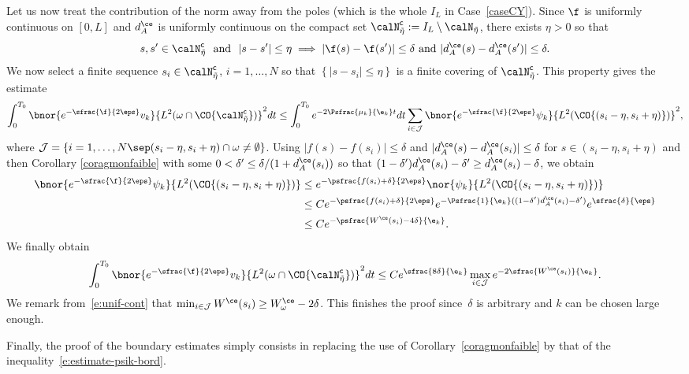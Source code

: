 Let us now treat the contribution of the norm away from the poles (which is the whole $I_L$ in Case~\ref{caseCY}).
Since $\f$ is uniformly continuous on $[0,L]$ and $d_A^{\ce}$ is uniformly continuous on the compact set $\calN_{\tilde{\eta}}^{\mathsf{c}} :=I_L \setminus \calN_{\tilde{\eta}}$, there exists $\eta>0$ so that
\begin{equation}
\label{e:unif-cont}
s,s'\in \calN_{\tilde{\eta}}^{\mathsf{c}} \ \text{ and } \ |s-s'|\leq \eta \implies |\f(s)-\f(s')|\leq \delta \text{ and } |d_A^{\ce}(s)-d_A^{\ce}(s')|\leq \delta.
\end{equation}
We now select a finite sequence $s_i\in \calN_{\tilde{\eta}}^{\mathsf{c}}$, $i=1,\dots,N$ so that $\left\{|s-s_i|\leq \eta\right\}$ is a finite covering of $\calN_{\tilde{\eta}}^{\mathsf{c}}$. This property gives the estimate
\[
\int_0^{T_0}\bnor{e^{-\sfrac{\f}{2\eps}}v_{k} }{L^2(\omega\cap \CO{\calN_{\tilde{\eta}}^{\mathsf{c}}})}^2 dt\leq \int_0^{T_0}e^{-2\Psfrac{\mu_k}{\e_{k}} t} dt\sum_{i\in \mathcal{J}} \bnor{e^{-\sfrac{\f}{2\eps}}\psi_k }{L^2(\CO{(s_i-\eta, s_i +\eta)})}^2,
\]
where $\mathcal{J}=\left\{i=1,\dots,N\sep (s_i-\eta, s_i +\eta)\cap\omega \neq \emptyset\right\}$.
Using $|f(s)-f(s_{i})|\leq \delta$ and $|d_A^{\ce}(s)-d_A^{\ce}(s_{i})|\leq \delta$ for $s\in (s_i-\eta, s_i +\eta)$ and then Corollary \ref{coragmonfaible} with some $0<\delta'\leq \delta/(1+d_A^{\ce}(s_{i}))$ so that $(1-\delta')d_A^{\ce}(s_{i}) - \delta' \geq d_A^{\ce}(s_{i}) - \delta $, we obtain
\begin{align*}
\bnor{e^{-\sfrac{\f}{2\eps}}\psi_k }{L^2(\CO{(s_i-\eta, s_i +\eta)})}& \leq e^{-\psfrac{f(s_i)+\delta}{2\eps}} \nor{\psi_k }{L^2(\CO{(s_i-\eta, s_i +\eta)})}\\
& \leq C e^{-\psfrac{f(s_i)+\delta}{2\eps}}e^{-\Psfrac{1}{\e_k} ((1-\delta')d_A^{\ce}(s_{i}) - \delta') } e^{\sfrac{\delta}{\eps}}\\
&\leq C e^{-\psfrac{W^{\ce}(s_i)-4\delta}{\e_k} }.
\end{align*}
We finally obtain
\[
\int_0^{T_0}\bnor{e^{-\sfrac{\f}{2\eps}}v_{k} }{L^2(\omega\cap \CO{\calN_{\tilde{\eta}}^{\mathsf{c}}})}^2 dt\leq C e^{\sfrac{8\delta}{\e_k} }\max_{i\in \mathcal{J}}e^{-2\sfrac{W^{\ce}(s_i)}{\e_k} }.
\]
We remark from~\eqref{e:unif-cont} that $\min_{i\in \mathcal{J}}W^{\ce}(s_i)\geq W^{\ce}_{\omega}-2\delta $. This finishes the proof since~$\delta$ is arbitrary and $k$ can be chosen large enough.

Finally, the proof of the boundary estimates simply consists in replacing the use of Corollary~\ref{coragmonfaible} by that of the inequality~\eqref{e:estimate-psik-bord}.
\enp


